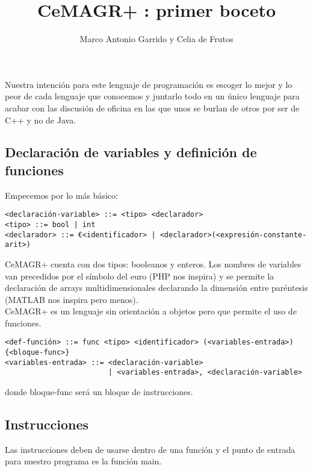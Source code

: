 \documentclass[spanish, a4paper, 12pt] {article}
\newcommand{\lname}[0]{CeMAGR+ }
\begin{document}
\title{\lname: primer boceto}
\author{Marco Antonio Garrido y Celia de Frutos}
\date{}
\maketitle
Nuestra intención para este lenguaje de programación es escoger lo mejor y lo peor de cada lenguaje que conocemos y juntarlo todo en un único lenguaje para acabar con las discusión de oficina en las que unos se burlan de otros por ser de C++ y no de Java.
\subsection*{Declaración de variables y definición de funciones}
Empecemos por lo más básico:
\begin{verbatim}
<declaración-variable> ::= <tipo> <declarador>
<tipo> ::= bool | int
<declarador> ::= €<identificador> | <declarador>(<expresión-constante-arit>)
\end{verbatim}
\lname cuenta con dos tipos: booleanos y enteros. Los nombres de variables van precedidos por el símbolo del euro (PHP nos inspira) y se permite la declaración de arrays multidimensionales declarando la dimensión entre paréntesis (MATLAB nos inspira pero menos).\\

\lname es un lenguaje sin orientación a objetos pero que permite el uso de funciones.
\begin{verbatim}
<def-función> ::= func <tipo> <identificador> (<variables-entrada>) {<bloque-func>}
<variables-entrada> ::= <declaración-variable>
                        | <variables-entrada>, <declaración-variable>
\end{verbatim}
donde bloque-func será un bloque de instrucciones.
\subsection*{Instrucciones}
Las instrucciones deben de usarse dentro de una función y el punto de entrada para nuestro programa es la función main.\\
\end{document}
